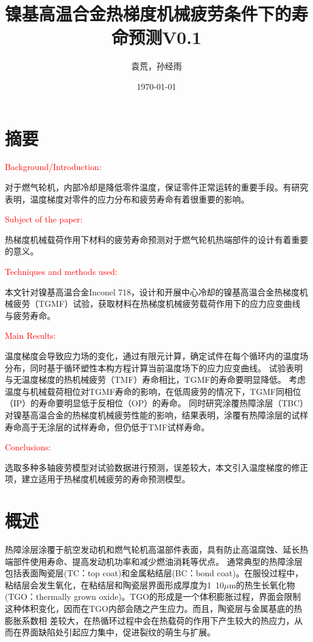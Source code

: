 \documentclass{article}
\newcommand{\marked}[1]{\textcolor{red}{#1}}
\begin{document}
\title{镍基高温合金热梯度机械疲劳条件下的寿命预测V0.1}

\author{袁荒，孙经雨}
\date{\today}
\maketitle
\tableofcontents

\section*{摘要}
\marked{Background/Introduction:}

对于燃气轮机，内部冷却是降低零件温度，保证零件正常运转的重要手段。有研究表明，温度梯度对零件的应力分布和疲劳寿命有着很重要的影响。

\marked{Subject of the paper:}

热梯度机械载荷作用下材料的疲劳寿命预测对于燃气轮机热端部件的设计有着重要的意义。

\marked{Techniques and methods used:}

本文针对镍基高温合金Inconel 718，设计和开展中心冷却的镍基高温合金热梯度机械疲劳（TGMF）试验，获取材料在热梯度机械疲劳载荷作用下的应力应变曲线与疲劳寿命。

\marked{Main Results:}

温度梯度会导致应力场的变化，通过有限元计算，确定试件在每个循环内的温度场分布，同时基于循环塑性本构方程计算当前温度场下的应力应变曲线。
试验表明与无温度梯度的热机械疲劳（TMF）寿命相比，TGMF的寿命要明显降低。
考虑温度与机械载荷相位对TGMF寿命的影响，在低周疲劳的情况下，TGMF同相位（IP）的寿命要明显低于反相位（OP）的寿命。
同时研究涂覆热障涂层（TBC）对镍基高温合金的热梯度机械疲劳性能的影响，结果表明，涂覆有热障涂层的试样寿命高于无涂层的试样寿命，但仍低于TMF试样寿命。

\marked{Conclusions:}

选取多种多轴疲劳模型对试验数据进行预测，误差较大，本文引入温度梯度的修正项，建立适用于热梯度机械疲劳的寿命预测模型。

\section{概述}
热障涂层涂覆于航空发动机和燃气轮机高温部件表面，具有防止高温腐蚀、延长热端部件使用寿命、提高发动机功率和减少燃油消耗等优点。
通常典型的热障涂层包括表面陶瓷层(TC：top coat)和金属粘结层(BC：bond coat)。在服役过程中，粘结层会发生氧化，在粘结层和陶瓷层界面形成厚度为1~10$\mu$m的热生长氧化物(TGO：thermally grown oxide)。TGO的形成是一个体积膨胀过程，界面会限制这种体积变化，因而在TGO内部会随之产生应力。而且，陶瓷层与金属基底的热膨胀系数相
差较大，在热循环过程中会在热载荷的作用下产生较大的热应力，从而在界面缺陷处引起应力集中，促进裂纹的萌生与扩展。
\end{document}

